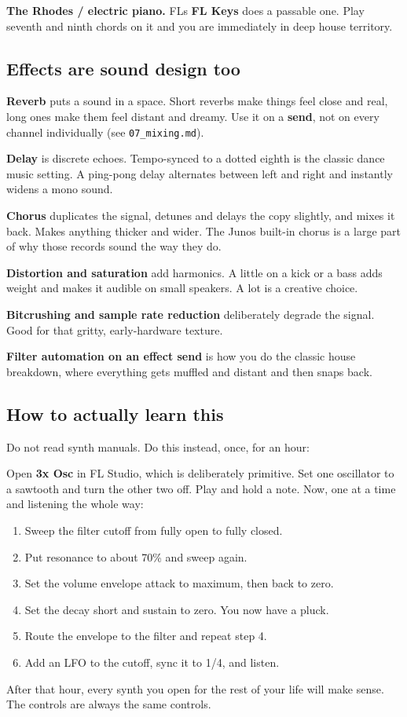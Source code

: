 \textbf{The Rhodes / electric piano.} FL\textquotesingle s \textbf{FL Keys} does a passable one. Play seventh and ninth
chords on it and you are immediately in deep house territory.

\subsection{Effects are sound design too}\label{th05_sound_design-effects-are-sound-design-too}

\textbf{Reverb} puts a sound in a space. Short reverbs make things feel close and real, long ones
make them feel distant and dreamy. Use it on a \textbf{send}, not on every channel individually
(see \texttt{07\_mixing.md}).

\textbf{Delay} is discrete echoes. Tempo-synced to a dotted eighth is the classic dance music
setting. A ping-pong delay alternates between left and right and instantly widens a mono
sound.

\textbf{Chorus} duplicates the signal, detunes and delays the copy slightly, and mixes it back.
Makes anything thicker and wider. The Juno\textquotesingle s built-in chorus is a large part of why those
records sound the way they do.

\textbf{Distortion and saturation} add harmonics. A little on a kick or a bass adds weight and
makes it audible on small speakers. A lot is a creative choice.

\textbf{Bitcrushing and sample rate reduction} deliberately degrade the signal. Good for that
gritty, early-hardware texture.

\textbf{Filter automation on an effect send} is how you do the classic house breakdown, where
everything gets muffled and distant and then snaps back.

\subsection{How to actually learn this}\label{th05_sound_design-how-to-actually-learn-this}

Do not read synth manuals. Do this instead, once, for an hour:

Open \textbf{3x Osc} in FL Studio, which is deliberately primitive. Set one oscillator to a
sawtooth and turn the other two off. Play and hold a note. Now, one at a time and listening
the whole way:

\begin{enumerate}
\def\labelenumi{\arabic{enumi}.}
\tightlist
\item
  Sweep the filter cutoff from fully open to fully closed.
\item
  Put resonance to about 70\% and sweep again.
\item
  Set the volume envelope attack to maximum, then back to zero.
\item
  Set the decay short and sustain to zero. You now have a pluck.
\item
  Route the envelope to the filter and repeat step 4.
\item
  Add an LFO to the cutoff, sync it to 1/4, and listen.
\end{enumerate}

After that hour, every synth you open for the rest of your life will make sense. The
controls are always the same controls.

